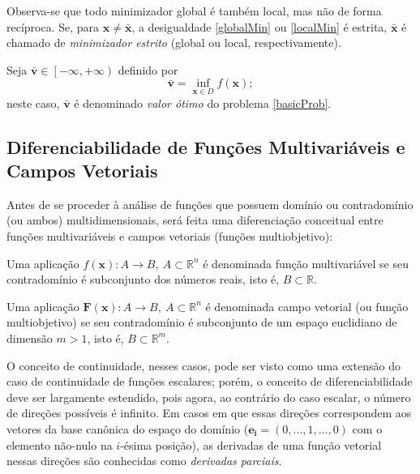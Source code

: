 Observa-se que todo minimizador global \'{e} tamb\'{e}m local, mas n\~{a}o de forma rec\'{i}proca. Se, para $\mathbf{x} \ne \bar{\mathbf{x}}$, a desigualdade \eqref{globalMin} ou \eqref{localMin} \'{e} estrita, $\bar{\mathbf{x}}$ \'{e} chamado de \textit{minimizador estrito} (global ou local, respectivamente).

\begin{definition} 
Seja $\bar{\mathbf{v}} \in \left[ -\infty,+\infty \right)$ definido por
\begin{equation}
\bar{\mathbf{v}} = \inf_{\mathbf{x} \in D} f(\mathbf{x});
\end{equation}
neste caso, $\bar{\mathbf{v}}$ \'{e} denominado \textit{valor \'{o}timo} do problema \eqref{basicProb}.
\end{definition} 

\subsection{Diferenciabilidade de Fun\c{c}\~{o}es Multivari\'{a}veis e Campos Vetoriais}

Antes de se proceder \`{a} an\'{a}lise de fun\c{c}\~{o}es que possuem dom\'{i}nio ou contradom\'{i}nio (ou ambos) multidimensionais, ser\'{a} feita uma diferencia\c{c}\~{a}o conceitual entre fun\c{c}\~{o}es multivari\'{a}veis e campos vetoriais (fun\c{c}\~{o}es multiobjetivo):

\begin{definition}
Uma aplica\c{c}\~{a}o $f(\mathbf{x}): A \to B,~ A \subset \mathbb{R}^{n}$ \'{e} denominada fun\c{c}\~{a}o multivari\'{a}vel se seu contradom\'{i}nio \'{e} subconjunto dos n\'{u}meros reais, isto \'{e}, $B \subset \mathbb{R}$.
\end{definition}

\begin{definition}
Uma aplica\c{c}\~{a}o $\mathbf{F}(\mathbf{x}): A \to B,~ A \subset \mathbb{R}^{n}$ \'{e} denominada campo vetorial (ou fun\c{c}\~{a}o multiobjetivo) se seu contradom\'{i}nio \'{e} subconjunto de um espa\c{c}o euclidiano de dimens\~{a}o $m > 1$, isto \'{e}, $B \subset \mathbb{R}^{m}$.
\end{definition}

O conceito de continuidade, nesses casos, pode ser visto como uma extens\~{a}o do caso de continuidade de fun\c{c}\~{o}es escalares; por\'{e}m, o conceito de diferenciabilidade deve ser largamente estendido, pois agora, ao contr\'{a}rio do caso escalar, o n\'{u}mero de dire\c{c}\~{o}es poss\'{i}veis \'{e} infinito. Em casos em que essas dire\c{c}\~{o}es correspondem aos vetores da base can\^{o}nica do espa\c{c}o do dom\'{i}nio ($\mathbf{e_i} = (0,...,1,...,0)$ com o elemento n\~{a}o-nulo na $i$-\'{e}sima posi\c{c}\~{a}o), as derivadas de uma fun\c{c}\~{a}o vetorial nessas dire\c{c}\~{o}es s\~{a}o conhecidas como \textit{derivadas parciais}.

